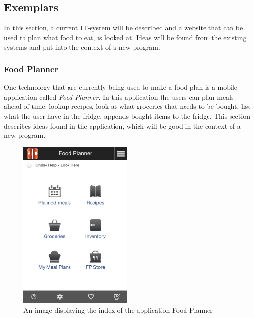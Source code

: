 \subsection{Exemplars}
In this section, a current IT-system will be described and a website that can be used to plan what food to eat, is looked at.
Ideas will be found from the existing systems and put into the context of a new program. 

\subsubsection{Food Planner}
One technology that are currently being used to make a food plan is a mobile application called \textit{Food Planner}.
In this application the users can plan meals ahead of time, lookup recipes, look at what groceries that needs to be bought, list what the user have in the fridge, appends bought items to the fridge.
This section describes ideas found in the application, which will be good in the context of a new program.

\begin{figure}[H]
    \centering
    \includegraphics[width=0.5\textwidth]{Grafik/FoodPlanner/index}
    \caption{An image displaying the index of the application Food Planner}
    \label{FoodPlannerIndex}
\end{figure}

